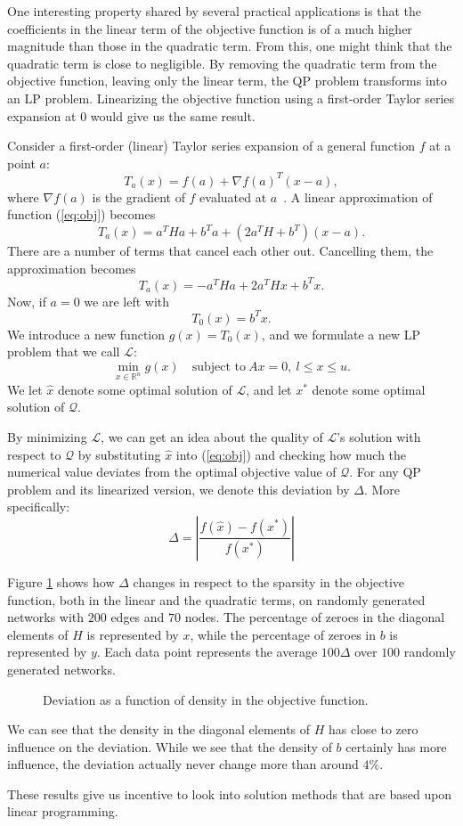 One interesting property shared by several practical applications is that the
coefficients in the linear term of the objective function is of a much higher
magnitude than those in the quadratic term.
From this, one might think that the quadratic term is close to negligible.
By removing the quadratic term from the objective function, leaving only the
linear term, the QP problem transforms into an LP problem.
Linearizing the objective function using a first-order Taylor series expansion
at 0 would give us the same result.

Consider a first-order (linear) Taylor series expansion of a
general function $f$ at a point $a$:
\[
T_a(x) = f(a) + \nabla f(a)^T(x-a),
\]
where $\nabla f(a)$ is the gradient of $f$ evaluated at $a$~\cite{apostol}.
A linear approximation of function (\ref{eq:obj}) becomes
\[
T_a(x) = a^THa + b^Ta + (2a^TH + b^T)(x - a).
\]
There are a number of terms that cancel each other out. Cancelling them,
the approximation becomes
\begin{equation}
\label{eq:texp}
T_a(x) = - a^THa + 2a^THx + b^Tx.
\end{equation}
Now, if $a = 0$ we are left with
\[
T_0(x) = b^Tx.
\]
We introduce a new function $g(x) = T_0(x)$, and we formulate a new LP problem
that we call $\mathcal{L}$:
\[
\min_{x \in \mathbb{R}^n} g(x)
\quad \textrm{subject to}
~
Ax = 0,
~
l \le x \le u.
\]
We let $\hat{x}$ denote some optimal solution of $\mathcal{L}$, and let $x^*$
denote some optimal solution of $\mathcal{Q}$.

By minimizing $\mathcal{L}$, we can get an idea about the quality of
$\mathcal{L}$'s solution with respect to $\mathcal{Q}$ by substituting
$\hat{x}$ into (\ref{eq:obj}) and checking how much the numerical value
deviates from the optimal objective value of $\mathcal{Q}$.
For any QP problem and its linearized version, we denote this deviation by
$\Delta$.
More specifically:
\[
\Delta = \left|\frac{f(\hat{x}) - f(x^*)}{f(x^*)}\right|
\]

Figure \ref{fig:sparsobj} shows how $\Delta$ changes in respect to the sparsity
in the objective function, both in the linear and the quadratic terms, on
randomly generated networks with $200$ edges and $70$ nodes.
The percentage of zeroes in the diagonal elements of $H$ is represented
by $x$, while the percentage of zeroes in $b$ is represented by $y$.
Each data point represents the average $100\Delta$ over
$100$ randomly generated networks. 

\begin{figure}[ht!]
\begin{center}
    
\end{center}
\caption{Deviation as a function of density in the objective function.}
\label{fig:sparsobj}
\end{figure}

We can see that the density in the diagonal elements of $H$ has
close to zero influence on the deviation.
While we see that the density of $b$ certainly has more influence,
the deviation actually never change more than around $4\%$.

These results give us incentive to look into solution methods that
are based upon linear programming.
